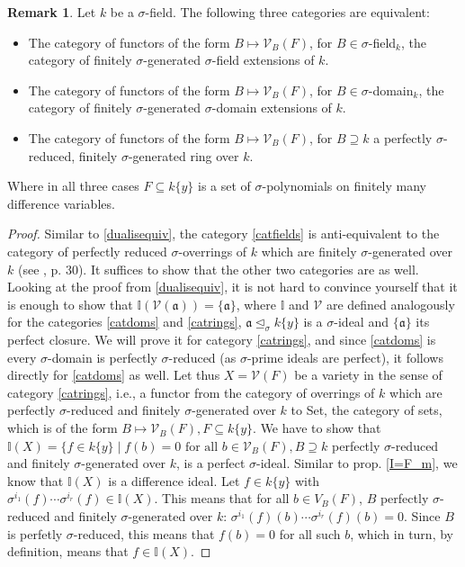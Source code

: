 \documentclass{article}
\def\I{\mathbb{I}}
\def\V{\mathcal{V}}
\def\a{\mathfrak{a}}
\def\s{\sigma}
\def\si{\unlhd_{\sigma}}
\def\fa{\text{ for all }}
\newenvironment{bew}{\begin{proof}[Proof]}{\end{proof}}
\theoremstyle{definition}
\newtheorem{rem}[Satz]{Remark}
\begin{document}
\begin{rem}
Let $k$ be a $\s$-field. The following three categories are equivalent:
\begin{itemize}
\item \label{catfields} The category of functors of the form $B \mapsto \V_B(F)$, for $B \in \s$-field$_k$, the category of finitely $\s$-generated $\s$-field extensions of $k$.
\item \label{catdoms} The category of functors of the form $B \mapsto \V_B(F)$, for $B \in \s$-domain$_k$, the category of finitely $\s$-generated $\s$-domain extensions of $k$.
\item \label{catrings} The category of functors of the form $B \mapsto \V_B(F)$, for $B \supseteq k$ a perfectly $\s$-reduced, finitely $\s$-generated ring over $k$.
\end{itemize}
Where in all three cases $F \subseteq k\{y\}$ is a set of $\s$-polynomials on finitely many difference variables.
\begin{bew}
Similar to \ref{dualisequiv}, the category \ref{catfields} is anti-equivalent to the category of perfectly reduced $\s$-overrings of $k$ which are finitely $\s$-generated over $k$ (see \cite{wibmer}, p. 30).
It suffices to show that the other two categories are as well. Looking at the proof from \ref{dualisequiv}, it is not hard to convince yourself that it is enough to show that $\I(\V(\a)) = \{\a\}$,
where $\I$ and $\V$ are defined analogously for the categories \ref{catdoms} and \ref{catrings}, $\a \si k\{y\}$ is a $\s$-ideal and $\{ \a \}$ its perfect closure. We will prove it for category \ref{catrings}, 
and since \ref{catdoms} is every $\s$-domain is perfectly $\s$-reduced (as $\s$-prime ideals are perfect), it follows directly for \ref{catdoms} as well.
Let thus $X = \V(F)$ be a variety in the sense of category \ref{catrings}, i.e., a functor from the category of overrings of $k$ which are perfectly $\s$-reduced and finitely $\s$-generated over $k$ to Set, the category of sets,
which is of the form $B \mapsto \V_B(F), F \subseteq k\{y\}$. We have to show that $\I(X) = \{ f \in k\{y\} \mid f(b) = 0 \fa b \in \V_B(F), B \supseteq k$ perfectly $\s$-reduced and finitely $\s$-generated over $k$,
 is a perfect $\s$-ideal. Similar to prop. \ref{I=F_m}, we know that $\I(X)$ is a difference ideal. Let $f \in k\{y\}$ with $\s^{i_1}(f) \cdots \s^{i_r}(f) \in \I(X)$. This means that for all $b \in V_B(F)$,
 $B$ perfectly $\s$-reduced and finitely $\s$-generated over $k$: $\s^{i_1}(f)(b) \cdots \s^{i_r}(f)(b) = 0$. Since $B$ is perfetly $\s$-reduced, this means that $f(b) = 0$ for all such $b$,
 which in turn, by definition, means that $f \in \I(X)$. 

\end{bew}

\end{rem}
\end{document}

